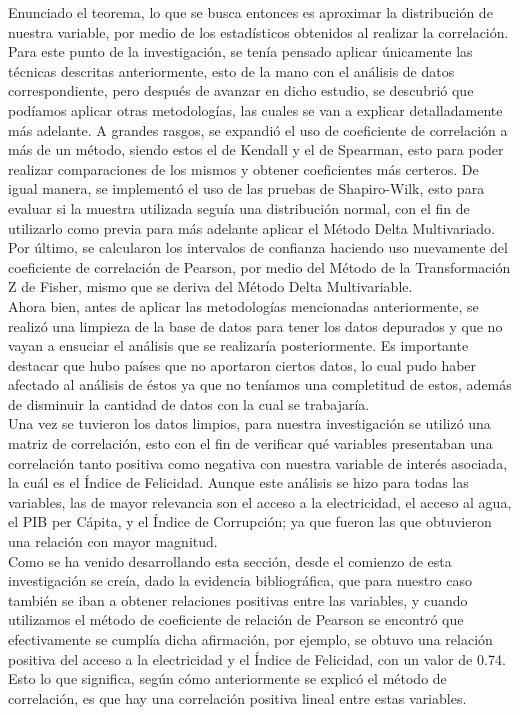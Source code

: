 Enunciado el teorema, lo que se busca entonces es aproximar la distribución de nuestra variable, por medio de los estadísticos obtenidos al realizar la correlación. \\

Para este punto de la investigación, se tenía pensado aplicar únicamente las técnicas descritas anteriormente, esto de la mano con el análisis de datos correspondiente, pero después de avanzar en dicho estudio, se descubrió que podíamos aplicar otras metodologías, las cuales se van a explicar detalladamente más adelante. A grandes rasgos, se expandió el uso de coeficiente de correlación a más de un método, siendo estos el de Kendall y el de Spearman, esto para poder realizar comparaciones de los mismos y obtener coeficientes más certeros. De igual manera, se implementó el uso de las pruebas de Shapiro-Wilk, esto para evaluar si la muestra utilizada seguía una distribución normal, con el fin de utilizarlo como previa para más adelante aplicar el Método Delta Multivariado. Por último, se calcularon los intervalos de confianza haciendo uso nuevamente del coeficiente de correlación de Pearson, por medio del Método de la Transformación Z de Fisher, mismo que se deriva del Método Delta Multivariable.\\

Ahora bien, antes de aplicar las metodologías mencionadas anteriormente, se realizó una limpieza de la base de datos para tener los datos depurados y que no vayan a ensuciar el análisis que se realizaría posteriormente. Es importante destacar que hubo países que no aportaron ciertos datos, lo cual pudo haber afectado al análisis de éstos ya que no teníamos una completitud de estos, además de disminuir la cantidad de datos con la cual se trabajaría.\\

Una vez se tuvieron los datos limpios, para nuestra investigación se utilizó una matriz de correlación, esto con el fin de verificar qué variables presentaban una correlación tanto positiva como negativa con nuestra variable de interés asociada, la cuál es el Índice de Felicidad. Aunque este análisis se hizo para todas las variables, las de mayor relevancia son el acceso a la electricidad, el acceso al agua, el PIB per Cápita, y el Índice de Corrupción; ya que fueron las que obtuvieron una relación con mayor magnitud. \\

Como se ha venido desarrollando esta sección, desde el comienzo de esta investigación se creía, dado la evidencia bibliográfica, que para nuestro caso también se iban a obtener relaciones positivas entre las variables, y cuando utilizamos el método de coeficiente de relación de Pearson se encontró que efectivamente se cumplía dicha afirmación, por ejemplo, se obtuvo una relación positiva del acceso a la electricidad y el Índice de Felicidad, con un valor de 0.74. Esto lo que significa, según cómo anteriormente se explicó el método de correlación, es que hay una correlación positiva lineal entre estas variables. 

